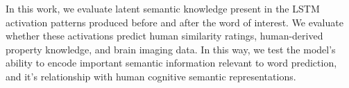 In this work, we evaluate latent semantic knowledge present in the LSTM activation patterns produced before and after the word of interest. We evaluate whether these activations predict human similarity ratings, human-derived property knowledge, and brain imaging data. In this way, we test the model's ability to encode important semantic information relevant to word prediction, and it's relationship with human cognitive semantic representations.
